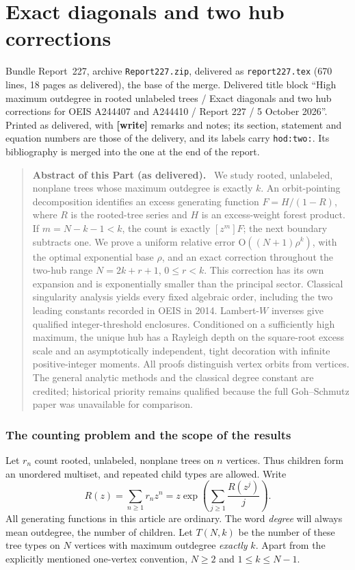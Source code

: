 \documentclass[11pt,letterpaper]{article}
\theoremstyle{definition}\newtheorem{definition}[theorem]{Definition}
\theoremstyle{remark}\newtheorem{remark}[theorem]{Remark}
\newcommand{\bigO}{\mathrm O}
\newcommand{\file}[1]{\nolinkurl{#1}}
\newenvironment{partabstract}{\begin{quote}\small\noindent\textbf{Abstract of this Part (as delivered).}\ }{\end{quote}}
\newcommand{\partsource}[1]{\par\noindent\begin{minipage}{\textwidth}\small #1\end{minipage}\par\medskip}
\begin{document}
\part{Exact diagonals and two hub corrections}\label{hod:two:part}
\partsource{Bundle Report~227, archive \file{Report227.zip}, delivered as \file{report227.tex} (670 lines, 18 pages as delivered), the base of the merge. Delivered title block ``High maximum outdegree in rooted unlabeled trees / Exact diagonals and two hub corrections for OEIS A244407 and A244410 / Report 227 / 5 October 2026''. Printed as delivered, with \textbf{[write]} remarks and notes; its section, statement and equation numbers are those of the delivery, and its labels carry \file{hod:two:}. Its bibliography is merged into the one at the end of the report.}
\begin{partabstract}
We study rooted, unlabeled, nonplane trees whose maximum outdegree is exactly $k$. An orbit-pointing decomposition identifies an excess generating function $F=H/(1-R)$, where $R$ is the rooted-tree series and $H$ is an excess-weight forest product. If $m=N-k-1<k$, the count is exactly $[z^m]F$; the next boundary subtracts one. We prove a uniform relative error $\bigO((N+1)\rho^k)$, with the optimal exponential base $\rho$, and an exact correction throughout the two-hub range $N=2k+r+1$, $0\le r<k$. This correction has its own expansion and is exponentially smaller than the principal sector. Classical singularity analysis yields every fixed algebraic order, including the two leading constants recorded in OEIS in 2014. Lambert-$W$ inverses give qualified integer-threshold enclosures. Conditioned on a sufficiently high maximum, the unique hub has a Rayleigh depth on the square-root excess scale and an asymptotically independent, tight decoration with infinite positive-integer moments. All proofs distinguish vertex orbits from vertices. The general analytic methods and the classical degree constant are credited; historical priority remains qualified because the full Goh--Schmutz paper was unavailable for comparison.
\end{partabstract}


\section{The counting problem and the scope of the results}
Let $r_n$ count rooted, unlabeled, nonplane trees on $n$ vertices. Thus children form an unordered multiset, and repeated child types are allowed. Write
\begin{equation}\label{hod:two:eq:R}
R(z)=\sum_{n\ge1}r_nz^n
=z\exp\!\left(\sum_{j\ge1}\frac{R(z^j)}j\right).
\end{equation}
All generating functions in this article are ordinary. The word \emph{degree} will always mean outdegree, the number of children. Let $T(N,k)$ be the number of these tree types on $N$ vertices with maximum outdegree \emph{exactly} $k$. Apart from the explicitly mentioned one-vertex convention, $N\ge2$ and $1\le k\le N-1$.
\end{document}
